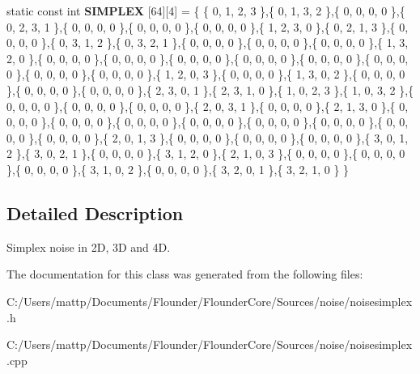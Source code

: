 \begin{DoxyCompactItemize}
\item 
\mbox{\label{classflounder_1_1noisesimplex_a7795c0a4755f633b5eae7865f040a004}} 
static const int {\bfseries S\+I\+M\+P\+L\+EX} \mbox{[}64\mbox{]}\mbox{[}4\mbox{]} = \{ \{ 0, 1, 2, 3 \},\{ 0, 1, 3, 2 \},\{ 0, 0, 0, 0 \},\{ 0, 2, 3, 1 \},\{ 0, 0, 0, 0 \},\{ 0, 0, 0, 0 \},\{ 0, 0, 0, 0 \},\{ 1, 2, 3, 0 \},\{ 0, 2, 1, 3 \},\{ 0, 0, 0, 0 \},\{ 0, 3, 1, 2 \},\{ 0, 3, 2, 1 \},\{ 0, 0, 0, 0 \},\{ 0, 0, 0, 0 \},\{ 0, 0, 0, 0 \},\{ 1, 3, 2, 0 \},\{ 0, 0, 0, 0 \},\{ 0, 0, 0, 0 \},\{ 0, 0, 0, 0 \},\{ 0, 0, 0, 0 \},\{ 0, 0, 0, 0 \},\{ 0, 0, 0, 0 \},\{ 0, 0, 0, 0 \},\{ 0, 0, 0, 0 \},\{ 1, 2, 0, 3 \},\{ 0, 0, 0, 0 \},\{ 1, 3, 0, 2 \},\{ 0, 0, 0, 0 \},\{ 0, 0, 0, 0 \},\{ 0, 0, 0, 0 \},\{ 2, 3, 0, 1 \},\{ 2, 3, 1, 0 \},\{ 1, 0, 2, 3 \},\{ 1, 0, 3, 2 \},\{ 0, 0, 0, 0 \},\{ 0, 0, 0, 0 \},\{ 0, 0, 0, 0 \},\{ 2, 0, 3, 1 \},\{ 0, 0, 0, 0 \},\{ 2, 1, 3, 0 \},\{ 0, 0, 0, 0 \},\{ 0, 0, 0, 0 \},\{ 0, 0, 0, 0 \},\{ 0, 0, 0, 0 \},\{ 0, 0, 0, 0 \},\{ 0, 0, 0, 0 \},\{ 0, 0, 0, 0 \},\{ 0, 0, 0, 0 \},\{ 2, 0, 1, 3 \},\{ 0, 0, 0, 0 \},\{ 0, 0, 0, 0 \},\{ 0, 0, 0, 0 \},\{ 3, 0, 1, 2 \},\{ 3, 0, 2, 1 \},\{ 0, 0, 0, 0 \},\{ 3, 1, 2, 0 \},\{ 2, 1, 0, 3 \},\{ 0, 0, 0, 0 \},\{ 0, 0, 0, 0 \},\{ 0, 0, 0, 0 \},\{ 3, 1, 0, 2 \},\{ 0, 0, 0, 0 \},\{ 3, 2, 0, 1 \},\{ 3, 2, 1, 0 \} \}
\end{DoxyCompactItemize}


\subsection{Detailed Description}
Simplex noise in 2D, 3D and 4D. 



The documentation for this class was generated from the following files\+:\begin{DoxyCompactItemize}
\item 
C\+:/\+Users/mattp/\+Documents/\+Flounder/\+Flounder\+Core/\+Sources/noise/noisesimplex.\+h\item 
C\+:/\+Users/mattp/\+Documents/\+Flounder/\+Flounder\+Core/\+Sources/noise/noisesimplex.\+cpp\end{DoxyCompactItemize}
